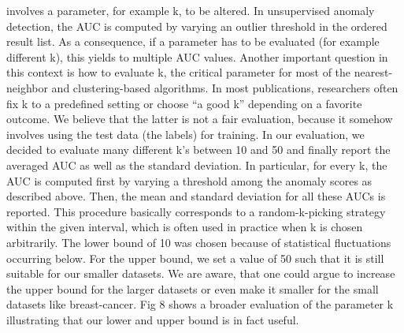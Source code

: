 {involves a parameter, for example k, to be altered. In unsupervised anomaly detection, the
AUC is computed by varying an outlier threshold in the ordered result list. As a consequence,
if a parameter has to be evaluated (for example different k), this yields to multiple AUC values.
Another important question in this context is how to evaluate k, the critical parameter for most
of the nearest-neighbor and clustering-based algorithms. In most publications, researchers
often fix k to a predefined setting or choose “a good k” depending on a favorite outcome. We
believe that the latter is not a fair evaluation, because it somehow involves using the test data
(the labels) for training. In our evaluation, we decided to evaluate many different k’s between
10 and 50 and finally report the averaged AUC as well as the standard deviation. In particular,
for every k, the AUC is computed first by varying a threshold among the anomaly scores as
described above. Then, the mean and standard deviation for all these AUCs is reported. This
procedure basically corresponds to a random-k-picking strategy within the given interval,
which is often used in practice when k is chosen arbitrarily. The lower bound of 10 was chosen
because of statistical fluctuations occurring below. For the upper bound, we set a value of 50
such that it is still suitable for our smaller datasets. We are aware, that one could argue to
increase the upper bound for the larger datasets or even make it smaller for the small datasets
like breast-cancer. Fig 8 shows a broader evaluation of the parameter k illustrating that our
lower and upper bound is in fact useful.}


